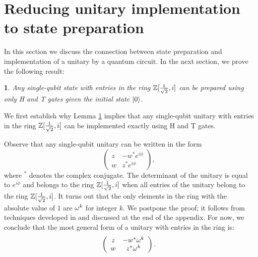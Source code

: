 \documentclass[english,journal]{extarticle}
\theoremstyle{plain}
\theoremstyle{plain}
\theoremstyle{plain}
\newtheorem{lem}{\protect\lemmaname}
\theoremstyle{definition}
\theoremstyle{plain}
\theoremstyle{plain}
\providecommand{\lemmaname}{\inputencoding{latin9}Lemma}
\begin{document}
\section{Reducing unitary implementation to state preparation} \label{sec:3}
In this section we discuss the connection between state preparation
and implementation of a unitary by a quantum circuit.  In the next section, we prove the following result: 
\begin{lem}
\label{thm:implementability}Any single-qubit state with entries in the ring
$\mathbb{Z}[\frac{1}{\sqrt{2}},i]$ can be prepared using only H and T gates given the initial
state $\left|0\right\rangle$. 
\end{lem}
We first establish why Lemma \ref{thm:implementability} implies that any single-qubit unitary
with entries in the ring $\mathbb{Z}[\frac{1}{\sqrt{2}},i]$ can be implemented exactly using H and T gates.

Observe that any single-qubit unitary can be
written in the form
\[
\left(\begin{array}{cc}
z & -w^{*}e^{i\phi}\\
w & z^{*}e^{i\phi}
\end{array}\right),
\]
where ${}^{*}$ denotes the complex conjugate.  The determinant of
the unitary is equal to $e^{i\phi}$ and belongs to the ring $\mathbb{Z}[\frac{1}{\sqrt{2}},i]$ when
all entries of the unitary belong to the ring $\mathbb{Z}[\frac{1}{\sqrt{2}},i]$.  It turns out that the
only elements in the ring with the absolute value of $1$ are $\omega^{k}$
for integer $k$.  We postpone the proof; it follows from techniques
developed in  and discussed at the end of the
appendix.  For now, we conclude that the most general form of a unitary with entries in
the ring is: 
\[
\left(\begin{array}{cc}
z & -w^{*}\omega^{k}\\
w & z^{*}\omega^{k}
\end{array}\right).
\]
\end{document}
